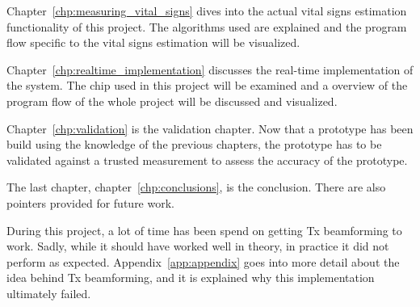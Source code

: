 Chapter~\ref{chp:measuring_vital_signs} dives into the actual vital signs estimation functionality of this project. The algorithms used are explained and the program flow specific to the vital signs estimation will be visualized.

Chapter~\ref{chp:realtime_implementation} discusses the real-time implementation of the system. The chip used in this project will be examined and a overview of the program flow of the whole project will be discussed and visualized.

Chapter~\ref{chp:validation} is the validation chapter. Now that a prototype has been build using the knowledge of the previous chapters, the prototype has to be validated against a trusted measurement to assess the accuracy of the prototype.

The last chapter, chapter~\ref{chp:conclusions}, is the conclusion. There are also pointers provided for future work.

During this project, a lot of time has been spend on getting Tx beamforming to work. Sadly, while it should have worked well in theory, in practice it did not perform as expected. Appendix~\ref{app:appendix} goes into more detail about the idea behind Tx beamforming, and it is explained why this implementation ultimately failed.

